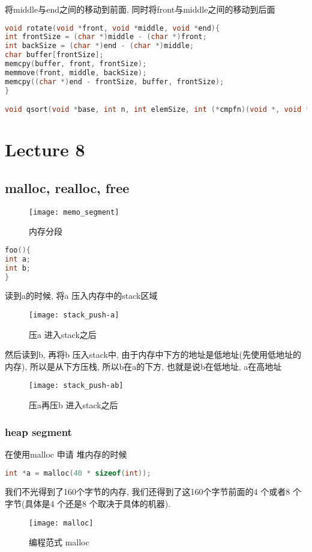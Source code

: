 \documentclass{article}
\begin{document}
将middle与end之间的移动到前面, 同时将front与middle之间的移动到后面
\begin{lstlisting}[language = C]
void rotate(void *front, void *middle, void *end){
int frontSize = (char *)middle - (char *)front;
int backSize = (char *)end - (char *)middle;
char buffer[frontSize];
memcpy(buffer, front, frontSize);
memmove(front, middle, backSize);
memcpy((char *)end - frontSize, buffer, frontSize);
}

void qsort(void *base, int n, int elemSize, int (*cmpfn)(void *, void *))
\end{lstlisting}

\section{Lecture 8}
\subsection{malloc, realloc, free}
\begin{figure}[htbp]
	\centering
	\texttt{[image: memo\_segment]}\\
	\caption{内存分段}\label{fig.memo.segment}
\end{figure}

\begin{lstlisting}[language = C]
foo(){
int a;
int b;
}
\end{lstlisting}
读到a的时候, 将a 压入内存中的stack区域
\begin{figure}[htbp]
	\centering
	\texttt{[image: stack\_push-a]}\\
	\caption{压a 进入stack之后}\label{fig.stack.push.a}
\end{figure}
然后读到b, 再将b 压入stack中, 由于内存中下方的地址是低地址(先使用低地址的内存), 所以是从下方压栈, 所以b在a的下方, 也就是说b在低地址, a在高地址
\begin{figure}[htbp]
	\centering
	\texttt{[image: stack\_push-ab]}\\
	\caption{压a再压b 进入stack之后}\label{fig.stack.push.ab}
\end{figure}
 \bigskip
\subsubsection{heap segment}
在使用malloc 申请 堆内存的时候
\begin{lstlisting}[language = C]
int *a = malloc(40 * sizeof(int));
\end{lstlisting}
我们不光得到了160个字节的内存,  我们还得到了这160个字节前面的4 个或者8 个字节(具体是4 个还是8 个取决于具体的机器).
\begin{figure}[htbp]
	\centering
	\texttt{[image: malloc]}\\
	\caption{编程范式 malloc}\label{fig.malloc}
\end{figure}
\end{document}
